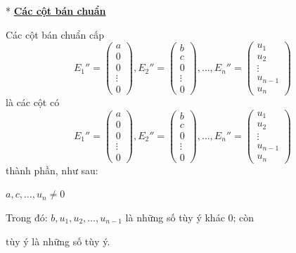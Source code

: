 \documentclass[12pt,a4paper]{article}
\let\ul\uline
\begin{document}
* \textbf{\ul{Các cột bán chuẩn}}

Các cột bán chuẩn cấp $$E_1'' = \begin{pmatrix} a \\ 0 \\ 0 \\ \vdots \\ 0 \end{pmatrix}, E_2'' = \begin{pmatrix} b \\ c \\ 0 \\ \vdots \\ 0 \end{pmatrix}, \dots, E_n'' = \begin{pmatrix} u_1 \\ u_2 \\ \vdots \\ u_{n-1} \\ u_n \end{pmatrix}$$ là các cột có
$$E_1'' = \begin{pmatrix} a \\ 0 \\ 0 \\ \vdots \\ 0 \end{pmatrix}, E_2'' = \begin{pmatrix} b \\ c \\ 0 \\ \vdots \\ 0 \end{pmatrix}, \dots, E_n'' = \begin{pmatrix} u_1 \\ u_2 \\ \vdots \\ u_{n-1} \\ u_n \end{pmatrix}$$ thành phần, như sau:

$a, c, \dots, u_n \neq 0$

Trong đó: $b, u_1, u_2, \dots, u_{n-1}$ là những số tùy ý khác 0;
còn

$\text{tùy ý}$ là những số tùy ý.
\end{document}
